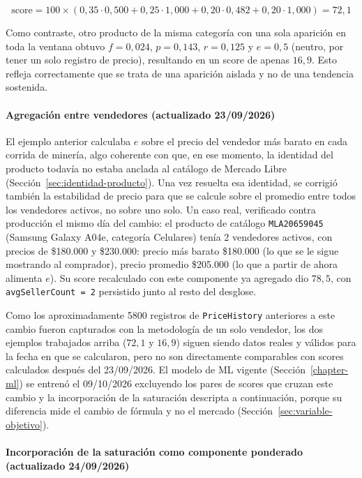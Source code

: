 \[
	\text{score} = 100 \times (0{,}35 \cdot 0{,}500 + 0{,}25 \cdot 1{,}000 + 0{,}20 \cdot 0{,}482 + 0{,}20 \cdot 1{,}000) = 72{,}1
\]

Como contraste, otro producto de la misma categoría con una sola aparición en toda la ventana obtuvo $f=0{,}024$, $p=0{,}143$, $r=0{,}125$ y $e=0{,}5$ (neutro, por tener un solo registro de precio), resultando en un score de apenas $16{,}9$. Esto refleja correctamente que se trata de una aparición aislada y no de una tendencia sostenida.

\paragraph*{Agregación entre vendedores (actualizado 23/09/2026)}

El ejemplo anterior calculaba $e$ sobre el precio del vendedor más barato en cada corrida de minería, algo coherente con que, en ese momento, la identidad del producto todavía no estaba anclada al catálogo de Mercado Libre (Sección~\ref{sec:identidad-producto}). Una vez resuelta esa identidad, se corrigió también la estabilidad de precio para que se calcule sobre el promedio entre todos los vendedores activos, no sobre uno solo. Un caso real, verificado contra producción el mismo día del cambio: el producto de catálogo \texttt{MLA20659045} (Samsung Galaxy A04e, categoría Celulares) tenía 2 vendedores activos, con precios de \$180.000 y \$230.000: precio más barato \$180.000 (lo que se le sigue mostrando al comprador), precio promedio \$205.000 (lo que a partir de ahora alimenta $e$). Su score recalculado con este componente ya agregado dio $78{,}5$, con \texttt{avgSellerCount = 2} persistido junto al resto del desglose.

Como los aproximadamente 5800 registros de \texttt{PriceHistory} anteriores a este cambio fueron capturados con la metodología de un solo vendedor, los dos ejemplos trabajados arriba ($72{,}1$ y $16{,}9$) siguen siendo datos reales y válidos para la fecha en que se calcularon, pero no son directamente comparables con scores calculados después del 23/09/2026. El modelo de ML vigente (Sección~\ref{chapter-ml}) se entrenó el 09/10/2026 excluyendo los pares de scores que cruzan este cambio y la incorporación de la saturación descripta a continuación, porque su diferencia mide el cambio de fórmula y no el mercado (Sección~\ref{sec:variable-objetivo}).

\paragraph*{Incorporación de la saturación como componente ponderado (actualizado 24/09/2026)}

